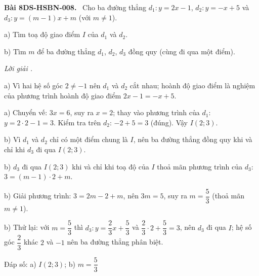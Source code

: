 \documentclass[12pt,a4paper]{article}
\newenvironment{problem}[1][]{\par\medskip\noindent\textbf{Bài #1.}\ }{\par}
\newenvironment{solution}[1][]{\par\noindent\textit{Lời giải #1.}\par}{\par}
\begin{document}
\begin{problem}[8DS-HSBN-008]
Cho ba đường thẳng $d_1: y = 2x - 1$, $d_2: y = -x + 5$ và $d_3: y = (m - 1)x + m$ (với $m \neq 1$).

a) Tìm toạ độ giao điểm $I$ của $d_1$ và $d_2$.

b) Tìm $m$ để ba đường thẳng $d_1$, $d_2$, $d_3$ đồng quy (cùng đi qua một điểm).

\begin{solution}
a) Vì hai hệ số góc $2 \neq -1$ nên $d_1$ và $d_2$ cắt nhau; hoành độ giao điểm là nghiệm của phương trình hoành độ giao điểm $2x - 1 = -x + 5$.

a) Chuyển vế: $3x = 6$, suy ra $x = 2$; thay vào phương trình của $d_1$: $y = 2 \cdot 2 - 1 = 3$. Kiểm tra trên $d_2$: $-2 + 5 = 3$ (đúng). Vậy $I(2; 3)$.

b) Vì $d_1$ và $d_2$ chỉ có một điểm chung là $I$, nên ba đường thẳng đồng quy khi và chỉ khi $d_3$ đi qua $I(2; 3)$.

b) $d_3$ đi qua $I(2; 3)$ khi và chỉ khi toạ độ của $I$ thoả mãn phương trình của $d_3$: $3 = (m - 1) \cdot 2 + m$.

b) Giải phương trình: $3 = 2m - 2 + m$, nên $3m = 5$, suy ra $m = \dfrac{5}{3}$ (thoả mãn $m \neq 1$).

b) Thử lại: với $m = \dfrac{5}{3}$ thì $d_3: y = \dfrac{2}{3}x + \dfrac{5}{3}$ và $\dfrac{2}{3} \cdot 2 + \dfrac{5}{3} = 3$, nên $d_3$ đi qua $I$; hệ số góc $\dfrac{2}{3}$ khác $2$ và $-1$ nên ba đường thẳng phân biệt.

Đáp số: a) $\boxed{I(2; 3)}$; b) $\boxed{m = \dfrac{5}{3}}$
\end{solution}
\end{problem}
\end{document}
